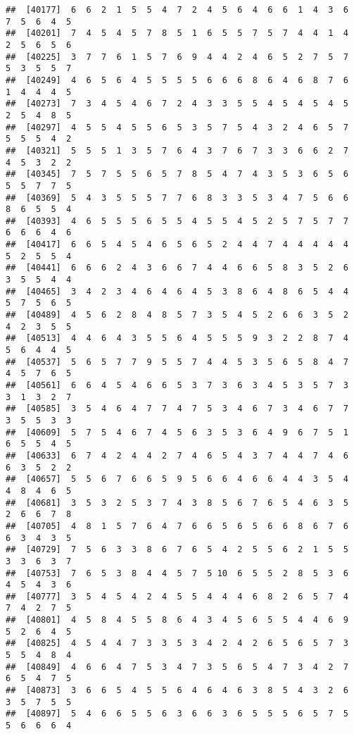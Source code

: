 \documentclass[
]{book}
\begin{document}
\begin{verbatim}
##  [40177]  6  6  2  1  5  5  4  7  2  4  5  6  4  6  6  1  4  3  6  7  5  6  4  5
##  [40201]  7  4  5  4  5  7  8  5  1  6  5  5  7  5  7  4  4  1  4  2  5  6  5  6
##  [40225]  3  7  7  6  1  5  7  6  9  4  4  2  4  6  5  2  7  5  7  5  3  5  5  7
##  [40249]  4  6  5  6  4  5  5  5  5  6  6  6  8  6  4  6  8  7  6  1  4  4  4  5
##  [40273]  7  3  4  5  4  6  7  2  4  3  3  5  5  4  5  4  5  4  5  2  5  4  8  5
##  [40297]  4  5  5  4  5  5  6  5  3  5  7  5  4  3  2  4  6  5  7  5  5  5  4  2
##  [40321]  5  5  5  1  3  5  7  6  4  3  7  6  7  3  3  6  6  2  7  4  5  3  2  2
##  [40345]  7  5  7  5  5  6  5  7  8  5  4  7  4  3  5  3  6  5  6  5  5  7  7  5
##  [40369]  5  4  3  5  5  5  7  7  6  8  3  3  5  3  4  7  5  6  6  8  6  5  5  4
##  [40393]  4  6  5  5  5  6  5  5  4  5  5  4  5  2  5  7  5  7  7  6  6  6  4  6
##  [40417]  6  6  5  4  5  4  6  5  6  5  2  4  4  7  4  4  4  4  4  5  2  5  5  4
##  [40441]  6  6  6  2  4  3  6  6  7  4  4  6  6  5  8  3  5  2  6  3  5  5  4  4
##  [40465]  3  4  2  3  4  6  4  6  4  5  3  8  6  4  8  6  5  4  4  5  7  5  6  5
##  [40489]  4  5  6  2  8  4  8  5  7  3  5  4  5  2  6  6  3  5  2  4  2  3  5  5
##  [40513]  4  4  6  4  3  5  5  6  4  5  5  5  9  3  2  2  8  7  4  5  6  4  4  5
##  [40537]  5  6  5  7  7  9  5  5  7  4  4  5  3  5  6  5  8  4  7  4  5  7  6  5
##  [40561]  6  6  4  5  4  6  6  5  3  7  3  6  3  4  5  3  5  7  3  3  1  3  2  7
##  [40585]  3  5  4  6  4  7  7  4  7  5  3  4  6  7  3  4  6  7  7  3  5  5  3  3
##  [40609]  5  7  5  4  6  7  4  5  6  3  5  3  6  4  9  6  7  5  1  6  5  5  4  5
##  [40633]  6  7  4  2  4  4  2  7  4  6  5  4  3  7  4  4  7  4  6  6  3  5  2  2
##  [40657]  5  5  6  7  6  6  5  9  5  6  6  4  6  6  4  4  3  5  4  4  8  4  6  5
##  [40681]  3  5  3  2  5  3  7  4  3  8  5  6  7  6  5  4  6  3  5  2  6  6  7  8
##  [40705]  4  8  1  5  7  6  4  7  6  6  5  6  5  6  6  8  6  7  6  6  3  4  3  5
##  [40729]  7  5  6  3  3  8  6  7  6  5  4  2  5  5  6  2  1  5  5  3  3  6  3  7
##  [40753]  7  6  5  3  8  4  4  5  7  5 10  6  5  5  2  8  5  3  6  4  5  4  3  6
##  [40777]  3  5  4  5  4  2  4  5  5  4  4  4  6  8  2  6  5  7  4  7  4  2  7  5
##  [40801]  4  5  8  4  5  5  8  6  4  3  4  5  6  5  5  4  4  6  9  5  2  6  4  5
##  [40825]  4  5  4  4  7  3  3  5  3  4  2  4  2  6  5  6  5  7  3  5  5  4  8  4
##  [40849]  4  6  6  4  7  5  3  4  7  3  5  6  5  4  7  3  4  2  7  6  5  4  7  5
##  [40873]  3  6  6  5  4  5  5  6  4  6  4  6  3  8  5  4  3  2  6  3  5  7  5  5
##  [40897]  5  4  6  6  5  5  6  3  6  6  3  6  5  5  5  6  5  7  5  5  6  6  6  4

\end{verbatim}
\end{document}
